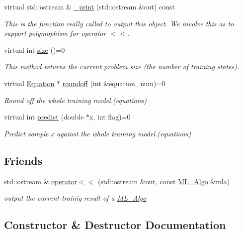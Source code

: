 \begin{DoxyCompactItemize}
virtual std\+::ostream \& \hyperlink{classML__Algo_ad689e5642c5db0971c53909b52cc67d4}{\+\_\+print} (std\+::ostream \&out) const 
\begin{DoxyCompactList}\small\item\em This is the function really called to output this object. We involve this as to support polymophism for operator $<$$<$. \end{DoxyCompactList}\item 
virtual int \hyperlink{classML__Algo_a8650c3894c1992492f8bc86edf1b3ffd}{size} ()=0
\begin{DoxyCompactList}\small\item\em This method returns the current problem size (the number of training states). \end{DoxyCompactList}\item 
virtual \hyperlink{classEquation}{Equation} $\ast$ \hyperlink{classML__Algo_a398214e0462ebfdde10e745240030a34}{roundoff} (int \&equation\+\_\+num)=0
\begin{DoxyCompactList}\small\item\em Round off the whole training model.(equations) \end{DoxyCompactList}\item 
virtual int \hyperlink{classML__Algo_aae12eabc95fd3eb5305f1ae7a14e0193}{predict} (double $\ast$x, int flag)=0
\begin{DoxyCompactList}\small\item\em Predict sample x against the whole training model.(equations) \end{DoxyCompactList}\end{DoxyCompactItemize}
\subsection*{Friends}
\begin{DoxyCompactItemize}
\item 
std\+::ostream \& \hyperlink{classML__Algo_a0d340e61ce196741e6fe74b58f11961c}{operator$<$$<$} (std\+::ostream \&out, const \hyperlink{classML__Algo}{M\+L\+\_\+\+Algo} \&mla)
\begin{DoxyCompactList}\small\item\em output the current trainig result of a \hyperlink{classML__Algo}{M\+L\+\_\+\+Algo} \end{DoxyCompactList}\end{DoxyCompactItemize}


\subsection{Constructor \& Destructor Documentation}
